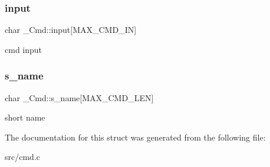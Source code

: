 \subsubsection{\texorpdfstring{input}{input}}
{\footnotesize\ttfamily char \+\_\+\+Cmd\+::input\mbox{[}M\+A\+X\+\_\+\+C\+M\+D\+\_\+\+IN\mbox{]}}

cmd input \mbox{\label{struct__Cmd_ac7a8c09e258cb2b2f63d179943616d08}} 
\subsubsection{\texorpdfstring{s\+\_\+name}{s\_name}}
{\footnotesize\ttfamily char \+\_\+\+Cmd\+::s\+\_\+name\mbox{[}M\+A\+X\+\_\+\+C\+M\+D\+\_\+\+L\+EN\mbox{]}}

short name 

The documentation for this struct was generated from the following file\+:\begin{DoxyCompactItemize}
\item 
src/cmd.\+c\end{DoxyCompactItemize}
